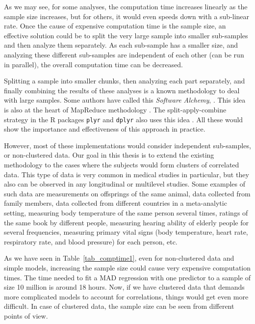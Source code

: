 \documentclass[11pt,a5paper,twoside]{book}
\begin{document}
As we may see, for some analyses, the computation time increases linearly as the sample size increases, but for others, it would even speeds down with a sub-linear rate. Once the cause of expensive computation time is the sample size, an effective solution could be to split the very large sample into smaller sub-samples and then analyze them separately. As each sub-sample has a smaller size, and analyzing these different sub-samples are independent of each other (can be run in parallel), the overall computation time can be decreased. 

Splitting a sample into smaller chunks, then analyzing each part separately, and finally combining the results of these analyses is a known methodology to deal with large samples. Some authors have called this \emph{Software Alchemy}, \cite{matloff2014}. This idea is also at the heart of MapReduce methodology \citep{dean2008}. The split-apply-combine strategy in the R packages {\tt{plyr}} and {\tt{dplyr}} also uses this idea \citep{wickham2011}. All these would show the importance and effectiveness of this approach in practice. 


However, most of these implementations would consider independent sub-samples, or non-clustered data. Our goal in this thesis is to extend the existing methodology to the cases where the subjects would form clusters of correlated data. This type of data is very common in medical studies in particular, but they also can be observed in any longitudinal or multilevel studies. Some examples of such data are measurements on offsprings of the same animal, data collected from family members, data collected from different countries in a meta-analytic setting, measuring body temperature of the same person several times, ratings of the same book by different people, measuring hearing ability of elderly people for several frequencies, measuring primary vital signs (body temperature, heart rate, respiratory rate, and blood pressure) for each person, etc.

As we have seen in Table~\ref{tab_comptime1}, even for non-clustered data and simple models, increasing the sample size could cause very expensive computation times. The time needed to fit a MAD regression with one predictor to a sample of size 10 million is around 18 hours. Now, if we have clustered data that demands more complicated models to account for correlations, things would get even more difficult. In case of clustered data, the sample size can be seen from different points of view. 
\end{document}
